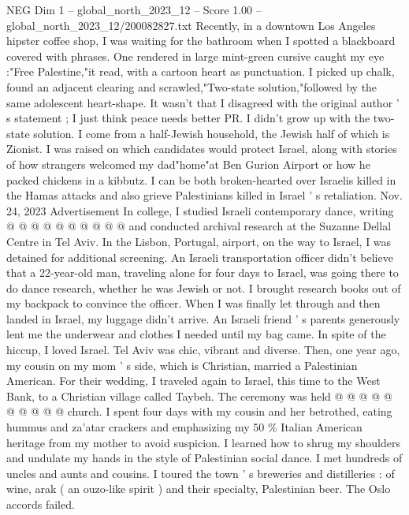 \begin{textsample}{NEG Dim 1 – global\_north\_2023\_12 – Score 1.00 – global\_north\_2023\_12/200082827.txt}  \label{ex:f1_neg_202}
Recently, in a downtown Los Angeles hipster coffee shop, I was waiting for the bathroom when I spotted a blackboard covered with phrases.
One rendered in large mint-green cursive caught my eye :"Free Palestine,"it read, with a cartoon heart as punctuation.
I picked up chalk, found an adjacent clearing and scrawled,"Two-state solution,"followed by the same adolescent heart-shape.
It wasn't that I disagreed with the original author ' s statement ; I just think peace needs better PR.
I didn't grow up with the two-state solution.
I come from a half-Jewish household, the Jewish half of which is Zionist.
I was raised on which candidates would protect Israel, along with stories of how strangers welcomed my dad"home"at Ben Gurion Airport or how he packed chickens in a kibbutz.
I can be both broken-hearted over Israelis killed in the Hamas attacks and also grieve Palestinians killed in Israel ' s retaliation.
Nov. 24, 2023 Advertisement In college, I studied Israeli contemporary dance, writing @ @ @ @ @ @ @ @ @ @ and conducted archival research at the Suzanne Dellal Centre in Tel Aviv.
In the Lisbon, Portugal, airport, on the way to Israel, I was detained for additional screening.
An Israeli transportation officer didn't believe that a 22-year-old man, traveling alone for four days to Israel, was going there to do dance research, whether he was Jewish or not.
I brought research books out of my backpack to convince the officer.
When I was finally let through and then landed in Israel, my luggage didn't arrive.
An Israeli friend ' s parents generously lent me the underwear and clothes I needed until my bag came.
In spite of the hiccup, I loved Israel.
Tel Aviv was chic, vibrant and diverse.
Then, one year ago, my cousin on my mom ' s side, which is Christian, married a Palestinian American.
For their wedding, I traveled again to Israel, this time to the West Bank, to a Christian village called Taybeh.
The ceremony was held @ @ @ @ @ @ @ @ @ @ church.
I spent four days with my cousin and her betrothed, eating hummus and za'atar crackers and emphasizing my 50 \% Italian American heritage from my mother to avoid suspicion.
I learned how to shrug my shoulders and undulate my hands in the style of Palestinian social dance.
I met hundreds of uncles and aunts and cousins.
I toured the town ' s breweries and distilleries : of wine, arak ( an ouzo-like spirit ) and their specialty, Palestinian beer.
The Oslo accords failed.

\end{textsample}
